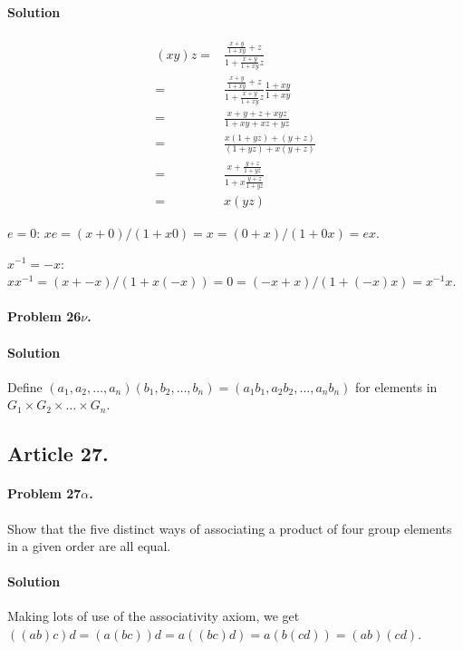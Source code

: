 \paragraph*{Solution}
\begin{eqnarray*}
(xy)z = & \frac{\frac{x+y}{1+xy} + z}{1+\frac{x+y}{1+xy}z} \\
      = & \frac{\frac{x+y}{1+xy} + z}{1+\frac{x+y}{1+xy}z} \frac{1+xy}{1+xy} \\
      = & \frac{x + y + z + xyz}{1 + xy + xz + yz} \\
      = & \frac{x(1+yz) + (y+z)}{(1+yz) + x(y+z)} \\
      = & \frac{x + \frac{y+z}{1+yz}}{1 + x \frac{y+z}{1+yz}} \\
      = & x(yz)
\end{eqnarray*}

$e = 0$: $xe = (x + 0)/(1 + x0) = x = (0 + x)/(1 + 0x) = ex$.

$x^{-1} = -x$: $xx^{-1} = (x + -x)/(1 + x(-x)) = 0 = (-x + x)/(1+(-x)x) = x^{-1}x$.

\paragraph{Problem 26$\nu$.}

\paragraph*{Solution}
Define $(a_1, a_2, \dots, a_n)(b_1,b_2,\dots,b_n) = (a_1 b_1, a_2 b_2, \dots, a_n b_n)$
for elements in $G_1 \times G_2 \times \dots \times G_n$.

\subsection{Article 27.}

\paragraph{Problem 27$\alpha$.}
Show that the five distinct ways of associating a product of four group elements
in a given order are all equal.

\paragraph*{Solution}
Making lots of use of the associativity axiom, we get
$ ((ab)c)d = (a(bc))d = a((bc)d) = a(b(cd)) = (ab)(cd) $.

